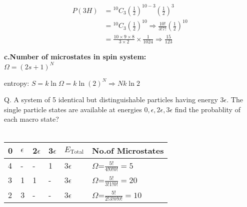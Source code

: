 \begin{answer}
	\begin{align*}
	P(3 H) &={ }^{10} C_{3}\left(\frac{1}{2}\right)^{10-3}\left(\frac{1}{2}\right)^{3} \\
	&={ }^{10} C_{3}\left(\frac{1}{2}\right)^{10} \Rightarrow \frac{10 !}{3 ! 7 !}\left(\frac{1}{2}\right)^{10}\\
	&=\frac{10 \times 9 \times 8}{3 \times 2} \times \frac{1}{1024} \Rightarrow \frac{15}{123}
	\end{align*}
\end{answer}
\textbf{c.\quad  Number of microstates in spin system:}\\
$\Omega=(2 s+1)^{N}$
\begin{note}
	entropy: $S=k \ln \Omega=k \ln(2)^N\Rightarrow Nk\ln 2$
\end{note}
Q. A system of 5 identical but distinguishable particles having energy $3\epsilon$. The single particle states are available at energies $0,\epsilon,2\epsilon,3\epsilon$ find the probablity of each macro state?\\\\
\renewcommand*{\arraystretch}{2}
\begin{tabular}{|p{1cm}|p{1cm}|p{1cm}|p{1cm}|p{1cm}|p{3cm}|}
	\hline
	0&$\epsilon$&2$\epsilon$&3$\epsilon$&$E_{\text{Total}}$&No.of Microstates\\\hline
	4&-&-&1&3$\epsilon$&$\Omega$=$\frac{5!}{4!0!0!}=5$\\\hline
	3&1&1&-&3$\epsilon$&$\Omega$=$\frac{5!}{3!1!0!}=20$\\\hline
	2&3&-&-&3$\epsilon$&$\Omega$=$\frac{5!}{2!3!0!0!}=10$\\\hline
\end{tabular}
